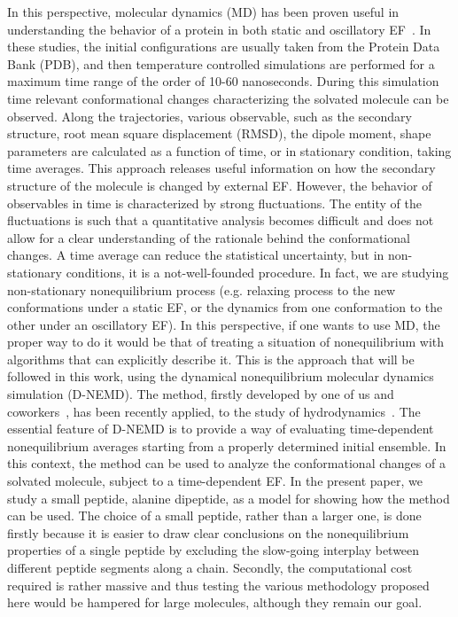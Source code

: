 \documentclass[a4paper,preprint,unsortedaddress,onecolumn]{revtex4-1}
\begin{document}
In this perspective, molecular dynamics (MD) has been proven useful in
understanding the behavior of a protein 
in both static and oscillatory EF~\cite{budi2005electric, budi2007effect, budi2008comparative,
  toschi2008effects, astrakas2011electric, astrakas2012structural,
  damm2012can, starzyk2013proteins, english2009nonequilibrium,
  solomentsev2012effects}. In these studies, the initial
configurations are usually taken from the Protein Data Bank (PDB),
and then temperature controlled simulations are performed for a maximum
time range of the order of 10-60 nanoseconds.
During this simulation time 
relevant conformational changes characterizing the solvated molecule can be observed. 
Along the trajectories, various observable, such as the
secondary structure, root mean square displacement (RMSD), the dipole
moment, shape parameters are calculated as a function of time, or
in stationary condition, taking time averages.
This approach releases useful information on how the
secondary structure of the molecule is changed by external  EF.  However,
the behavior of observables in time is characterized by 
strong
fluctuations. The entity of the fluctuations is such that a quantitative 
analysis becomes difficult and does not allow for  a clear understanding of the rationale behind the conformational changes.
A time average can reduce the statistical uncertainty,
but in non-stationary conditions, it is a not-well-founded procedure.
In fact, we are studying non-stationary nonequilibrium process
(e.g. relaxing process to the new conformations under a static
EF, or the dynamics from one conformation to the other under an oscillatory EF).
In this perspective, if one wants to use MD, the proper way to do it would be that of treating a situation of nonequilibrium with algorithms that can explicitly describe it.
This is the approach that will be followed in this work, using
the dynamical nonequilibrium molecular dynamics simulation (D-NEMD).
The method, firstly developed by one of us and coworkers~\cite{ciccotti1975direct, ciccotti1979thought}, 
has been recently applied, to the study of
hydrodynamics~\cite{orlandini2011hydrodynamics,
  orlandini2011hydrodynamics-01}. The essential feature of D-NEMD is to
provide a way of evaluating time-dependent
nonequilibrium averages starting from a properly determined initial ensemble.
In this context, the method can be used to analyze the
conformational changes of a solvated molecule, subject to a time-dependent EF.
In the present paper, we study a small peptide, alanine dipeptide, as a model for showing how the method can be used. 
The choice of a small peptide, rather than a larger one, is done firstly because it
is easier to draw clear conclusions on the nonequilibrium properties
of a single peptide by excluding the slow-going interplay between
different peptide segments along a chain.
Secondly, the computational cost required is rather massive and thus  testing
the various methodology proposed here would be hampered for large molecules,
although they remain our goal.
\end{document}
